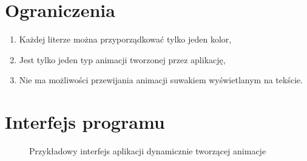 \documentclass[12pt]{article}
\begin{document}
\section{Ograniczenia}
\begin{enumerate}
\item{Każdej literze można przyporządkować tylko jeden kolor,}
\item{Jest tylko jeden typ animacji tworzonej przez aplikację,}
\item{Nie ma możliwości przewijania animacji suwakiem wyświetlanym na tekście.}
\end{enumerate}
\section{Interfejs programu}
\begin{figure}[ht!]
	\centering
	\caption{Przykładowy interfejs aplikacji dynamicznie tworzącej animacje}
\end{figure}
\end{document}
